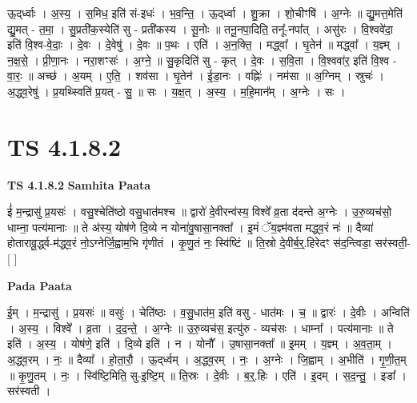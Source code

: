 \documentclass[17pt]{extarticle}
\begin{document}
ऊ॒द्‌र्ध्वाः । अ॒स्य॒ । स॒मिध॒ इति॑ सं-इधः॑ । भ॒व॒न्ति॒ । ऊ॒द्‌र्ध्वा । शु॒क्रा । शो॒चीꣳषि॑ । अ॒ग्नेः ॥ द्यु॒मत्त॒मेति॑ द्यु॒मत् - त॒मा॒ । सु॒प्रती॑क॒स्येति॑ सु - प्रती॑कस्य । सू॒नोः ॥ तनू॒नपा॒दिति॒ तनू᳚-नपा᳚त् । असु॑रः । वि॒श्ववे॑दा॒ इति॑ वि॒श्व-वे॒दाः॒ । दे॒वः । दे॒वेषु॑ । दे॒वः ॥ प॒थः । एति॑ । अ॒न॒क्ति॒ । मद्ध्वा᳚ । घृ॒तेन॑ ॥ मद्ध्वा᳚ । य॒ज्ञ्म् । न॒क्ष॒से॒ । प्री॒णा॒नः । नरा॒शꣳसः॑ । अ॒ग्ने॒ ॥ सु॒कृदिति॑ सु - कृत् । दे॒वः । स॒वि॒ता । वि॒श्ववा॑र॒ इति॑ वि॒श्व - वा॒रः॒ ॥ अच्छ॑ । अ॒यम् । ए॒ति॒ । शव॑सा । घृ॒तेन॑ । ई॒डा॒नः । वह्निः॑ । नम॑सा ॥ अ॒ग्निम् । स्रुचः॑ । अ॒द्ध्व॒रेषु॑ । प्र॒यथ्स्विति॑ प्र॒यत् - सु॒ ॥ सः । य॒क्ष॒त् । अ॒स्य॒ । म॒हि॒मान᳚म् । अ॒ग्नेः । सः ।  \newline




\section*{ TS 4.1.8.2 }

\textbf{TS 4.1.8.2 } \newline
\textbf{Samhita Paata} \newline

ई॑ म॒न्द्रासु॑ प्र॒यसः॑ । वसु॒श्चेति॑ष्ठो वसु॒धात॑मश्च ॥ द्वारो॑ दे॒वीरन्व॑स्य॒ विश्वे᳚ व्र॒ता द॑दन्ते अ॒ग्नेः । उ॒रु॒व्यच॑सो॒ धाम्ना॒ पत्य॑मानाः ॥ ते अ॑स्य॒ योष॑णे दि॒व्ये न योना॑वु॒षासा॒नक्ता᳚ । इ॒मं ॅय॒ज्ञ्म॑वता मद्ध्व॒रं नः॑ ॥ दैव्या॑ होतारावू॒र्द्ध्व-म॑द्ध्व॒रं नो॒ऽग्नेर्जि॒ह्वाम॒भि गृ॑णीतं । कृ॒णु॒तं नः॒ स्वि॑ष्टिं ॥ ति॒स्रो दे॒वीर्ब॒र्॒.हिरेदꣳ स॑द॒न्त्विडा॒ सर॑स्वती॒- [  ] \newline

\textbf{Pada Paata} \newline

ई॒म् । म॒न्द्रासु॑ । प्र॒यसः॑ ॥ वसुः॑ । चेति॑ष्ठः । व॒सु॒धात॑म॒ इति॑ वसु - धात॑मः । च॒ ॥ द्वारः॑ । दे॒वीः । अन्विति॑ । अ॒स्य॒ । विश्वे᳚ । व्र॒ता । द॒द॒न्ते॒ । अ॒ग्नेः ॥ उ॒रु॒व्यच॑स॒ इत्यु॑रु - व्यच॑सः । धाम्ना᳚ । पत्य॑मानाः ॥ ते इति॑ । अ॒स्य॒ । योष॑णे॒ इति॑ । दि॒व्ये इति॑ । न । योनौ᳚ । उ॒षासा॒नक्ता᳚ ॥ इ॒मम् । य॒ज्ञ्म् । अ॒व॒ता॒म् । अ॒द्ध्व॒रम् । नः॒ ॥ दैव्या᳚ । हो॒ता॒रौ॒ । ऊ॒द्‌र्ध्वम् । अ॒द्ध्व॒रम् । नः॒ । अ॒ग्नेः । जि॒ह्वाम् । अ॒भीति॑ । गृ॒णी॒त॒म् ॥ कृ॒णु॒तम् । नः॒ । स्वि॑ष्टि॒मिति॒ सु-इ॒ष्टि॒म् ॥ ति॒स्रः । दे॒वीः । ब॒र्॒.हिः । एति॑ । इ॒दम् । स॒द॒न्तु॒ । इडा᳚ । सर॑स्वती ।  \newline
\end{document}
